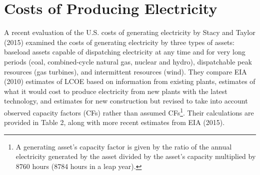 \section{Costs of Producing Electricity}

A recent evaluation of the U.S. costs of generating electricity by Stacy and Taylor (2015) examined the costs of generating electricity by three types of assets: baseload assets capable of dispatching electricity at any time and for very long periods (coal, combined-cycle natural gas, nuclear and hydro), dispatchable peak resources (gas turbines), and intermittent resources (wind). They compare EIA (2010) estimates of LCOE based on information from existing plants, estimates of what it would cost to produce electricity from new plants with the latest technology, and estimates for new construction but revised to take into account observed capacity factors (CFs) rather than assumed CFs\footnote{\label{CFs} A generating asset’s capacity factor is given by the ratio of the annual electricity generated by the asset divided by the asset’s capacity multiplied by 8760 hours (8784 hours in a leap year). }.  Their calculations are provided in Table 2, along with more recent estimates from EIA (2015).



